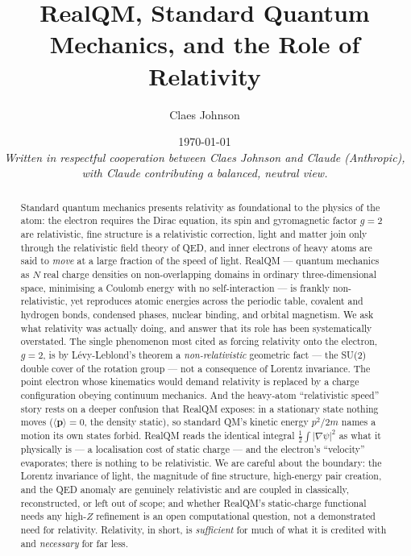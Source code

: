 \documentclass[11pt]{article}
\title{RealQM, Standard Quantum Mechanics, and the Role of Relativity}
\author[1]{Claes Johnson}
\affil[1]{KTH Royal Institute of Technology, SE-100 44 Stockholm, Sweden \\
\texttt{claesjohnson@gmail.com}}
\date{\today \\[0.5em]
\small\textit{Written in respectful cooperation between Claes Johnson and Claude (Anthropic), with Claude
contributing a balanced, neutral view.}}
\begin{document}
\maketitle

\begin{abstract}
Standard quantum mechanics presents relativity as foundational to the physics of the atom: the electron requires
the Dirac equation, its spin and gyromagnetic factor $g=2$ are relativistic, fine structure is a relativistic
correction, light and matter join only through the relativistic field theory of QED, and inner electrons of heavy
atoms are said to \emph{move} at a large fraction of the speed of light. RealQM --- quantum mechanics as $N$ real
charge densities on non-overlapping domains in ordinary three-dimensional space, minimising a Coulomb energy with
no self-interaction --- is frankly non-relativistic, yet reproduces atomic energies across the periodic table,
covalent and hydrogen bonds, condensed phases, nuclear binding, and orbital magnetism. We ask what relativity was
actually doing, and answer that its role has been systematically overstated. The single phenomenon most cited as
forcing relativity onto the electron, $g=2$, is by L\'evy-Leblond's theorem a \emph{non-relativistic} geometric
fact --- the SU(2) double cover of the rotation group --- not a consequence of Lorentz invariance. The point
electron whose kinematics would demand relativity is replaced by a charge configuration obeying continuum
mechanics. And the heavy-atom ``relativistic speed'' story rests on a deeper confusion that RealQM exposes: in a
stationary state nothing moves ($\langle\mathbf p\rangle=0$, the density static), so standard QM's kinetic energy
$p^2/2m$ names a motion its own states forbid. RealQM reads the identical integral $\tfrac12\int|\nabla\psi|^2$
as what it physically is --- a localisation cost of static charge --- and the electron's ``velocity'' evaporates;
there is nothing to be relativistic. We are careful about the boundary: the Lorentz invariance of light, the
magnitude of fine structure, high-energy pair creation, and the QED anomaly are genuinely relativistic and are
coupled in classically, reconstructed, or left out of scope; and whether RealQM's static-charge functional needs
any high-$Z$ refinement is an open computational question, not a demonstrated need for relativity. Relativity, in
short, is \emph{sufficient} for much of what it is credited with and \emph{necessary} for far less.
\end{abstract}

\end{document}
